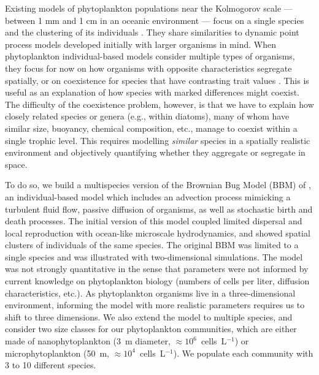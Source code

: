 \documentclass[12pt,english]{article}
\begin{document}
Existing models of phytoplankton populations near the Kolmogorov scale
--- between 1 mm and 1 cm in an oceanic environment \citep{barton_impact_2014}
--- focus on a single species and the clustering of its individuals
\citep{young_reproductive_2001,birch_master_2006,bouderbala_3d_2018,breier_emergence_2018}.
They share similarities to dynamic point process models \citep{law_population_2003,bolker_spatial_1999,plank_spatial_2015}
developed initially with larger organisms in mind. When phytoplankton
individual-based models consider multiple types of organisms, they
focus for now on how organisms with opposite characteristics \citep[e.g., increase versus decrease in density with turbulence in][]{borgnino_turbulence_2019,arrieta_fate_2020}
segregate spatially, or on coexistence for species that have contrasting
trait values \citep[e.g., size in][]{benczik_coexistence_2006}. This
is useful as an explanation of how species with marked differences
might coexist. The difficulty of the coexistence problem, however,
is that we have to explain how closely related species or genera (e.g.,
within diatoms), many of whom have similar size, buoyancy, chemical
composition, etc., manage to coexist within a single trophic level.
This requires modelling \emph{similar} species in a spatially realistic
environment and objectively quantifying whether they aggregate or
segregate in space.

To do so, we build a multispecies version of the Brownian Bug Model
(BBM) of \citet{young_reproductive_2001}, an individual-based model
which includes an advection process mimicking a turbulent fluid flow,
passive diffusion of organisms, as well as stochastic birth and death
processes. The initial version of this model \citep{young_reproductive_2001}
coupled limited dispersal and local reproduction with ocean-like microscale
hydrodynamics, and showed spatial clusters of individuals of the same
species. The original BBM was limited to a single species and was
illustrated with two-dimensional simulations. The model was not strongly
quantitative \citep{picoche_rescience_2022} in the sense that parameters
were not informed by current knowledge on phytoplankton biology (numbers
of cells per liter, diffusion characteristics, etc.). As phytoplankton
organisms live in a three-dimensional environment, informing the model
with more realistic parameters requires us to shift to three dimensions.
We also extend the model to multiple species, and consider two size
classes for our phytoplankton communities, which are either made of
nanophytoplankton (3~\textmu m diameter, $\approx10^{6}$~cells~L$^{-1}$)
or microphytoplankton (50~\textmu m, $\approx10^{4}$~cells~L$^{-1}$).
We populate each community with 3 to 10 different species.
\end{document}
